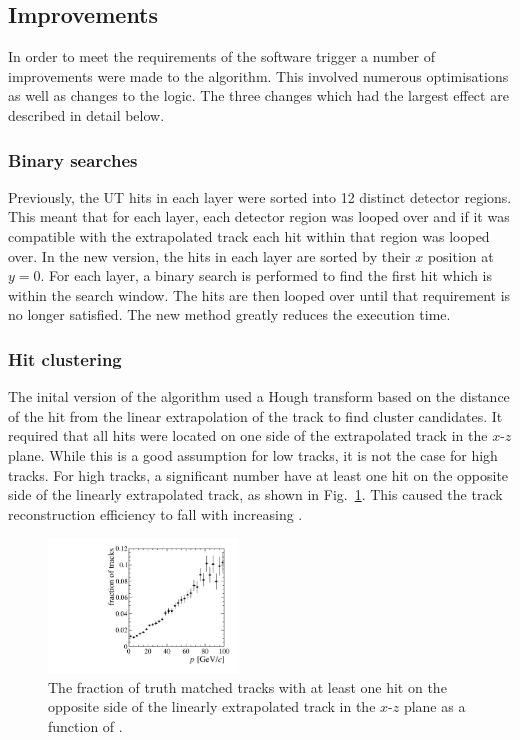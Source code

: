 \subsection{Improvements}

In order to meet the requirements of the software trigger a number of improvements were made to the \velout algorithm. This involved numerous \cpp optimisations as well as changes to the logic. The three changes which had the largest effect are described in detail below.

\subsubsection{Binary searches}

Previously, the UT hits in each layer were sorted into 12 distinct detector regions. This meant that for each layer, each detector region was looped over and if it was compatible with the extrapolated \velo track each hit within that region was looped over. In the new version, the hits in each layer are sorted by their $x$ position at $y = 0$. For each layer, a binary search is performed to find the first hit which is within the search window. The hits are then looped over until that requirement is no longer satisfied. The new method greatly reduces the execution time.

\subsubsection{Hit clustering}

The inital version of the \velout algorithm used a Hough transform based on the distance of the hit from the linear extrapolation of the \velo track to find cluster candidates. It required that all hits were located on one side of the extrapolated \velo track in the $x$-$z$ plane. While this is a good assumption for low \ptot tracks, it is not the case for high \ptot tracks. For high \ptot tracks, a significant number have at least one hit on the opposite side of the linearly extrapolated \velo track, as shown in Fig.~\ref{fig:wrong_side_hits}. This caused the track reconstruction efficiency to fall with increasing \ptot.

\begin{figure}[!tb]
\centering
\includegraphics[width=0.45\textwidth]{figs/upstream-tracking-upgrade/wrong_side_hits.pdf}
\caption{The fraction of truth matched tracks with at least one hit on the opposite side of the linearly extrapolated \velo track in the $x$-$z$ plane as a function of \ptot.}
\label{fig:wrong_side_hits}
\end{figure}

